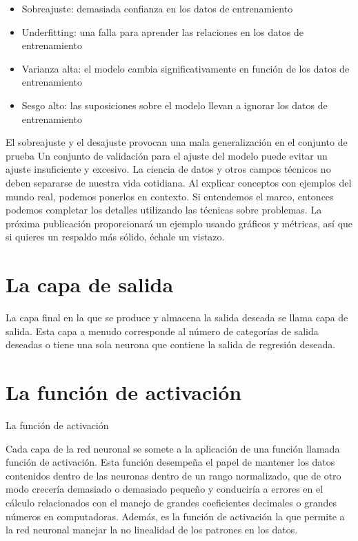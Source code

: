 \begin{itemize}

\item Sobreajuste: demasiada confianza en los datos de entrenamiento
\item Underfitting: una falla para aprender las relaciones en los datos de entrenamiento
\item Varianza alta: el modelo cambia significativamente en función de los datos de entrenamiento
\item Sesgo alto: las suposiciones sobre el modelo llevan a ignorar los datos de entrenamiento
\end{itemize}

El sobreajuste y el desajuste provocan una mala generalización en el conjunto de prueba
Un conjunto de validación para el ajuste del modelo puede evitar un ajuste insuficiente y excesivo.
La ciencia de datos y otros campos técnicos no deben separarse de nuestra vida cotidiana. Al explicar conceptos con ejemplos del mundo real, podemos ponerlos en contexto. Si entendemos el marco, entonces podemos completar los detalles utilizando las técnicas sobre problemas. La próxima publicación proporcionará un ejemplo usando gráficos y métricas, así que si quieres un respaldo más sólido, échale un vistazo.


\section{La capa de salida}

La capa final en la que se produce y almacena la salida deseada se llama capa de salida. Esta capa a menudo corresponde al número de categorías de salida deseadas o tiene una sola neurona que contiene la salida de regresión deseada.

\section{La función de activación}

La función de activación

Cada capa de la red neuronal se somete a la aplicación de una función llamada función de activación. Esta función desempeña el papel de mantener los datos contenidos dentro de las neuronas dentro de un rango normalizado, que de otro modo crecería demasiado o demasiado pequeño y conduciría a errores en el cálculo relacionados con el manejo de grandes coeficientes decimales o grandes números en computadoras. Además, es la función de activación la que permite a la red neuronal manejar la no linealidad de los patrones en los datos.

